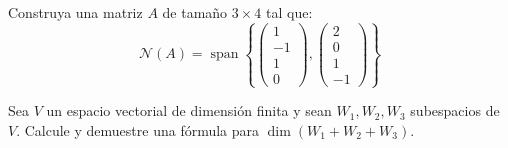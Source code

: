 \begin{prob} Construya una matriz $A$ de tamaño $3 \times 4$ tal que:
$$\mathcal{N}(A) = \operatorname{span}\left\{\begin{pmatrix} 1 \\ -1 \\ 1 \\ 0 \end{pmatrix}, \begin{pmatrix} 2 \\ 0 \\ 1 \\ -1 \end{pmatrix}\right\}$$
\end{prob}



\begin{prob} Sea $V$ un espacio vectorial de dimensión finita y sean $W_1, W_2, W_3$ subespacios de $V$. Calcule y demuestre una fórmula para $\dim(W_1 + W_2 + W_3).$
\end{prob}


 
